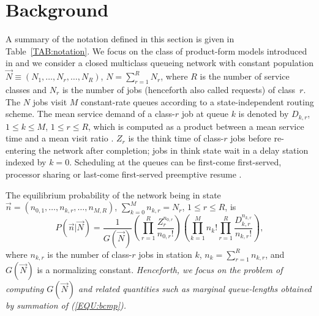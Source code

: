 \documentclass[journal,twocolumn,9.5pt]{IEEEtran}
\renewcommand{\Pr}{P}
\begin{document}
\section{Background}
\label{SEC:background}
A summary of the notation defined in this section is given in Table~\ref{TAB:notation}. We focus on the class of product-form models introduced in \cite{BasCMP75} and we consider a closed multiclass queueing network with constant population $\vec N\equiv (N_1,\ldots,N_r,\ldots,N_R)$, $N=\sum_{r=1}^R N_r$, where $R$ is the number of service classes and $N_r$ is the number of jobs (henceforth also called requests) of class~$r$. The $N$ jobs visit $M$ constant-rate queues according to a state-independent routing scheme.
The mean service demand of a class-$r$ job at queue $k$ is denoted by $D_{k,r}$, $1\leq k\leq M$, $1\leq r\leq R$, which is computed as a product between a mean service time and a mean visit ratio \cite{LazZGS84}. $Z_r$ is the think time of class-$r$ jobs before re-entering the network after completion; jobs in think state wait in a delay station indexed by $k=0$. Scheduling at the queues can be first-come first-served, processor sharing or last-come first-served preemptive resume \cite{BasCMP75}.

The equilibrium probability of the network being in state $\vec n=(n_{0,1},\ldots,n_{k,r},\ldots,n_{M,R})$, $\sum_{k=0}^M n_{k,r}=N_r$, $1\leq r\leq R$, is \cite{BasCMP75}
\begin{equation}
\label{EQU:bcmp}
\Pr(\vec n|\vec N)=\frac{1}{G(\vec N)}\left(\prod_{r=1}^R \frac{Z_{r}^{n_{0,r}}}{n_{0,r}!} \right) \left(\prod_{k=1}^M n_k!\prod_{r=1}^R \frac{D_{k,r}^{n_{k,r}}}{n_{k,r}!}\right),
\end{equation}
where $n_{k,r}$ is the number of class-$r$ jobs in station $k$, $n_k=\sum_{r=1}^R n_{k,r}$, and $G(\vec N)$ is a normalizing constant. %
\emph{Henceforth, we focus on the problem of computing $G(\vec N)$ and related quantities such as marginal queue-lengths obtained by summation of (\ref{EQU:bcmp}).}
\end{document}
